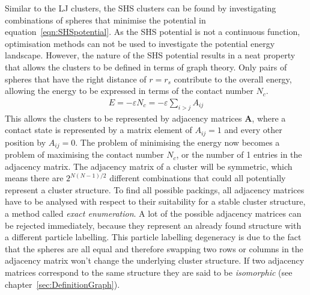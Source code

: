 Similar to the \ac{LJ} clusters, the \ac{SHS} clusters can be found by
investigating combinations of spheres that minimise the potential in
equation~\eqref{eqn:SHSpotential}. As the \ac{SHS} potential is not a continuous
function, optimisation methods can not be used to investigate the potential
energy landscape. However, the nature of the \ac{SHS} potential results in a
neat property that allows the clusters to be defined in terms of graph theory.
Only pairs of spheres that have the right distance of $r=r_s$ contribute to the
overall energy, allowing the energy to be expressed in terms of the contact
number $N_c$.
%
\begin{align}
    E=-\varepsilon N_c=-\varepsilon \sum\limits_{i>j} A_{ij}
\end{align}
%
This allows the clusters to be represented by adjacency matrices $\mathbf{A}$,
where a contact state is represented by a matrix element of $A_{ij}=1$
and every other position by
$A_{ij}=0$.\autocite{Arkus_DerivingFiniteSphere_2011} The problem of
minimising the energy now becomes a problem of maximising the contact number
$N_c$, or the number of 1 entries in the adjacency matrix. The adjacency matrix
of a cluster will be symmetric, which means there are $2^{N(N- 1)/2}$ different
combinations that could all potentially represent a cluster structure. To find
all possible packings, all adjacency matrices have to be analysed with respect
to their suitability for a stable cluster structure, a method called
\textit{exact enumeration}. A lot of the possible adjacency matrices can be
rejected immediately, because they represent an already found structure with a
different particle labelling. This particle labelling degeneracy is due to the
fact that the spheres are all equal and therefore swapping two rows or columns
in the adjacency matrix won't change the underlying cluster structure. If two
adjacency matrices correspond to the same structure they are said to be
\textit{isomorphic} (see chapter~\ref{sec:DefinitionGraph}).

